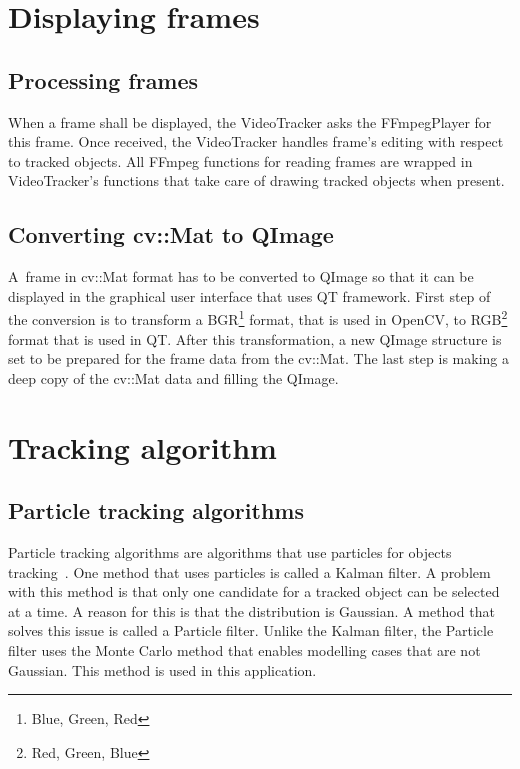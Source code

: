 \section{Displaying frames}
\subsection{Processing frames}
When a frame shall be displayed, the VideoTracker asks the FFmpegPlayer for this frame. Once received, the VideoTracker handles frame's editing with respect to tracked objects. All FFmpeg functions for reading frames are wrapped in VideoTracker's functions that take care of drawing tracked objects when present.

\subsection{Converting cv::Mat to QImage}\label{subs:mat2qimage}
A~frame in cv::Mat format has to be converted to QImage so that it can be displayed in the graphical user interface that uses QT framework. First step of the conversion is to transform a BGR\footnote{Blue, Green, Red} format, that is used in OpenCV, to RGB\footnote{Red, Green, Blue} format that is used in QT. After this transformation, a new QImage structure is set to be prepared for the frame data from the cv::Mat. The last step is making a deep copy of the cv::Mat data and filling the QImage.

\section{Tracking algorithm}\label{sec:trackingalgorithm}
\subsection{Particle tracking algorithms}
Particle tracking algorithms are algorithms that use particles for objects tracking~\cite{particle_tracking}. One method that uses particles is called a Kalman filter. A problem with this method is that only one candidate for a tracked object can be selected at a time. A reason for this is that the distribution is Gaussian. A method that solves this issue is called a Particle filter. Unlike the Kalman filter, the Particle filter uses the Monte Carlo method that enables modelling cases that are not Gaussian. This method is used in this application.

